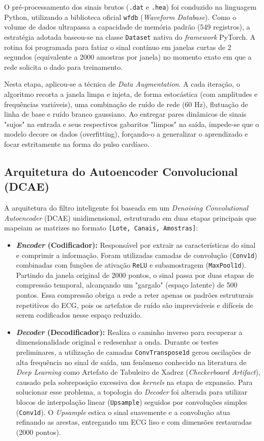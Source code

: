 \documentclass[tcc,capa]{texufpel}
\begin{document}
O pré-processamento dos sinais brutos (\texttt{.dat} e \texttt{.hea}) foi conduzido na linguagem Python, utilizando a biblioteca oficial \texttt{wfdb} (\textit{Waveform Database}). Como o volume de dados ultrapassa a capacidade de memória padrão (549 registros), a estratégia adotada baseou-se na classe \texttt{Dataset} nativa do \textit{framework} PyTorch. A rotina foi programada para fatiar o sinal contínuo em janelas curtas de 2 segundos (equivalente a 2000 amostras por janela) no momento exato em que a rede solicita o dado para treinamento.

Nesta etapa, aplicou-se a técnica de \textit{Data Augmentation}. A cada iteração, o algoritmo recorta a janela limpa e injeta, de forma estocástica (com amplitudes e frequências variáveis), uma combinação de ruído de rede (60 Hz), flutuação de linha de base e ruído branco gaussiano. Ao entregar pares dinâmicos de sinais "sujos" na entrada e seus respectivos gabaritos "limpos" na saída, impede-se que o modelo decore os dados (overfitting), forçando-o a generalizar o aprendizado e focar estritamente na forma do pulso cardíaco.

\subsection{Arquitetura do Autoencoder Convolucional (DCAE)}

A arquitetura do filtro inteligente foi baseada em um \textit{Denoising Convolutional Autoencoder} (DCAE) unidimensional, estruturado em duas etapas principais que mapeiam as matrizes no formato \texttt{[Lote, Canais, Amostras]}:

\begin{itemize}
    \item \textbf{\textit{Encoder} (Codificador):} Responsável por extrair as características do sinal e comprimir a informação. Foram utilizadas camadas de convolução (\texttt{Conv1d}) combinadas com funções de ativação \texttt{ReLU} e subamostragem (\texttt{MaxPool1d}). Partindo da janela original de 2000 pontos, o sinal passa por duas etapas de compressão temporal, alcançando um "gargalo" (espaço latente) de 500 pontos. Essa compressão obriga a rede a reter apenas os padrões estruturais repetitivos do ECG, pois os artefatos de ruído são imprevisíveis e difíceis de serem codificados nesse espaço reduzido.
    \item \textbf{\textit{Decoder} (Decodificador):} Realiza o caminho inverso para recuperar a dimensionalidade original e redesenhar a onda. Durante os testes preliminares, a utilização de camadas \texttt{ConvTranspose1d} gerou oscilações de alta frequência no sinal de saída, um fenômeno conhecido na literatura de \textit{Deep Learning} como Artefato de Tabuleiro de Xadrez (\textit{Checkerboard Artifact}), causado pela sobreposição excessiva dos \textit{kernels} na etapa de expansão. Para solucionar esse problema, a topologia do \textit{Decoder} foi alterada para utilizar blocos de interpolação linear (\texttt{Upsample}) seguidos por convoluções simples (\texttt{Conv1d}). O \textit{Upsample} estica o sinal suavemente e a convolução atua refinando as arestas, entregando um ECG liso e com dimensões restauradas (2000 pontos).
\end{itemize}
\end{document}
